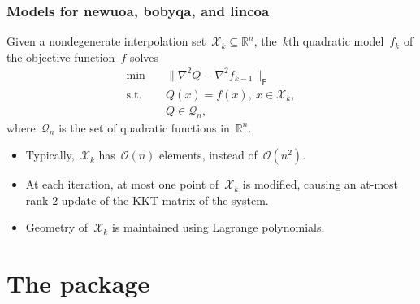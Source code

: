 \documentclass[usenames,dvipsnames,10pt]{beamer}
\newcommand{\norm}[2][]{#1\lVert#2#1\rVert}
\def\R{\ensuremath{\mathds{R}}}
\begin{document}
\begin{frame}
    \frametitle{Models for \gls{newuoa}, \gls{bobyqa}, and \gls{lincoa}}

    Given a nondegenerate \alert{interpolation set}~$\mathcal{X}_k \subseteq \R^n$, the~$k$th \alert{quadratic model}~$f_k$ of the objective function~$f$ solves
    \begin{align*}
        \min        & \quad \norm[\big]{\nabla^2 Q - \nabla^2 f_{k - 1}}_{\mathsf{F}}\\
        \text{s.t.} & \quad Q(x) = f(x), ~ x \in \mathcal{X}_k,\\
                    & \quad Q \in \mathcal{Q}_n,
    \end{align*}
    where~$\mathcal{Q}_n$ is the set of quadratic functions in~$\R^n$.

    \begin{itemize}
        \item Typically,~$\mathcal{X}_k$ has~\alert{$\mathcal{O}(n)$} elements, instead of~$\mathcal{O}(n^2)$.
        \item At each iteration, at most one point of~$\mathcal{X}_k$ is modified, causing an at-most \alert{rank-$2$ update} of the KKT matrix of the system.
        \item Geometry of~$\mathcal{X}_k$ is maintained using \alert{Lagrange polynomials}.
    \end{itemize}
\end{frame}

\section{The  package}
\end{document}
